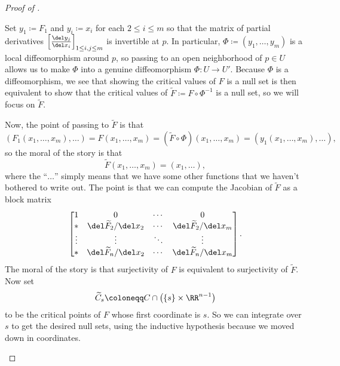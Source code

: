 \documentclass[../notes.tex]{subfiles}
\begin{document}
\begin{proof}[Proof of ]
\begin{enumerate}
		Set $y_1\coloneqq F_1$ and $y_i\coloneqq x_i$ for each $2\le i\le m$ so that the matrix of partial derivatives $\left[\frac{\del y_j}{\del x_i}\right]_{1\le i,j\le m}$ is invertible at $p$. In particular, $\Phi\coloneqq(y_1,\ldots,y_m)$ is a local diffeomorphism around $p$, so passing to an open neighborhood of $p\in U$ allows us to make $\Phi$ into a genuine diffeomorphism $\Phi\colon U\to U'$. Because $\Phi$ is a diffeomorphism, we see that showing the critical values of $F$ is a null set is then equivalent to show that the critical values of $\widetilde F\coloneqq F\circ\Phi^{-1}$ is a null set, so we will focus on $\widetilde F$.

		Now, the point of passing to $\widetilde F$ is that
		\[(F_1(x_1,\ldots,x_m),\ldots)=F(x_1,\ldots,x_m)=\left(\widetilde F\circ\Phi\right)(x_1,\ldots,x_m)=(y_1(x_1,\ldots,x_m),\ldots),\]
		so the moral of the story is that
		\[\widetilde F(x_1,\ldots,x_m)=(x_1,\ldots),\]
		where the ``$\ldots$'' simply means that we have some other functions that we haven't bothered to write out. The point is that we can compute the Jacobian of $\widetilde F$ as a block matrix
		\[\begin{bmatrix}
			1 & 0 & \cdots & 0 \\
			* & \del\widetilde F_2/\del x_2 & \cdots & \del\widetilde F_2/\del x_m \\
			\vdots & \vdots & \ddots & \vdots \\
			* & \del\widetilde F_n/\del x_2 & \cdots & \del\widetilde F_n/\del x_m
		\end{bmatrix}.\]
		The moral of the story is that surjectivity of $F$ is equivalent to surjectivity of $\widetilde F$. Now set
		\[\widetilde C_s\coloneqq C\cap\left(\{s\}\times\RR^{n-1}\right)\]
		to be the critical points of $F$ whose first coordinate is $s$. So we can integrate over $s$ to get the desired null sets, using the inductive hypothesis because we moved down in coordinates.
		\qedhere
	\end{enumerate}
\end{proof}
\end{document}
